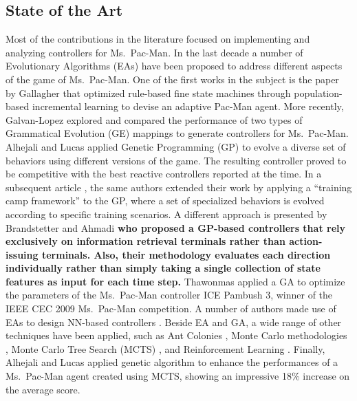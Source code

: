 \documentclass[journal]{IEEEtran}
\begin{document}
\subsection{State of the Art}
Most of the contributions in the literature focused on implementing and analyzing controllers for Ms.\  Pac-Man. In the last decade a number of Evolutionary Algorithms (EAs) have been proposed to address different aspects of the game of Ms.\  Pac-Man. One of the first works in the subject is the paper by Gallagher \cite{Gallagher03} that optimized rule-based fine state machines through population-based incremental learning to devise an adaptive Pac-Man agent. More recently, Galvan-Lopez \cite{Galvan-Lopez10} explored and compared the performance of two types of Grammatical Evolution (GE) mappings to generate controllers for Ms.\  Pac-Man. Alhejali and Lucas \cite{Alhejali10} applied Genetic Programming (GP) to evolve a diverse set of behaviors using different versions of the game. The resulting controller proved to be competitive with the best reactive controllers reported at the time. In a subsequent article \cite{AlhejaliLucas11}, the same authors extended their work by applying a ``training camp framework'' to the GP, where a set of specialized behaviors is evolved according to specific training scenarios. A different approach is presented by Brandstetter and Ahmadi \cite{Brandstetter12} \textbf{who proposed a GP-based controllers that rely exclusively on information retrieval terminals rather than action-issuing terminals. Also, their methodology evaluates each direction individually rather than simply taking a single collection of state features as input for each time step.} Thawonmas \cite{Thawonmas10} applied a GA to optimize the parameters of the Ms.\  Pac-Man controller ICE Pambush 3, winner of the IEEE CEC 2009 Ms.\  Pac-Man competition. A number of authors made use of EAs to design NN-based controllers \cite{Lucas05,Burrow09,Keunhyun10}. Beside EA and GA, a wide range of other techniques have been applied, such as  Ant Colonies \cite{Emilio2010}, Monte Carlo methodologies \cite{Tong2010,Tong2011}, Monte Carlo Tree Search (MCTS) \cite{Samothrakis2011, Ikehata2011}, and Reinforcement Learning \cite{Bom2013}. Finally, Alhejali and Lucas \cite{Alhejali2013} applied genetic algorithm to enhance the performances of a Ms.\  Pac-Man agent created using MCTS, showing an impressive 18\% increase on the average score. 
\end{document}

